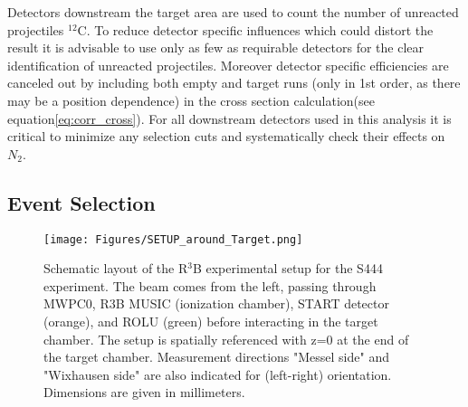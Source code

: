 \begin{enumerate}
Detectors downstream the target area are used to count the number of unreacted projectiles $^{12}$C. To reduce detector specific influences which could distort the result it is advisable to use only as few as requirable detectors for the clear identification of unreacted projectiles. Moreover detector specific efficiencies are canceled out by including both empty and target runs (only in 1st order, as there may be a position dependence) in the cross section calculation(see equation\ref{eq:corr_cross}). For all downstream detectors used in this analysis it is critical to minimize any selection cuts and systematically check their effects on $N_2$.
\end{enumerate}
\subsection{Event Selection}\label{subsec:event-sel}
\begin{figure}[htpb]
    \centering
    \texttt{[image: Figures/SETUP\_around\_Target.png]}
    \caption{
    Schematic layout of the R$^3$B experimental setup for the S444 experiment. The beam comes from the left, passing through MWPC0, R3B MUSIC (ionization chamber), START detector (orange), and ROLU (green) before interacting in the target chamber. The setup is spatially referenced with z=0 at the end of the target chamber. Measurement directions "Messel side" and "Wixhausen side" are also indicated for (left-right) orientation. Dimensions are given in millimeters. 
    }
    \label{fig:setup_target_region}
\end{figure}

